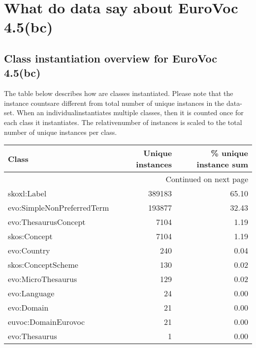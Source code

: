 \documentclass[10pt,a4paper,titlepage,final]{article}
\begin{document}
\section{What do data say about EuroVoc 4.5(bc)}
\subsection{Class instantiation overview for EuroVoc 4.5(bc)}
The table below describes how are classes instantiated. Please note that the instance countsare different from total number of unique instances in the data{-}set. When an individualinstantiates multiple classes, then it is counted once for each class it instantiates. The relativenumber of instances is scaled to the total number of unique instances per class.
\begin{longtable}{lrr}
\toprule
                      Class &  Unique instances &  \% unique instance sum \\
\midrule
\endhead
\midrule
\multicolumn{3}{r}{{Continued on next page}} \\
\midrule
\endfoot

\bottomrule
\endlastfoot
                skoxl:Label &            389183 &                  65.10 \\
 evo:SimpleNonPreferredTerm &            193877 &                  32.43 \\
       evo:ThesaurusConcept &              7104 &                   1.19 \\
               skos:Concept &              7104 &                   1.19 \\
                evo:Country &               240 &                   0.04 \\
         skos:ConceptScheme &               130 &                   0.02 \\
         evo:MicroThesaurus &               129 &                   0.02 \\
               evo:Language &                24 &                   0.00 \\
                 evo:Domain &                21 &                   0.00 \\
        euvoc:DomainEurovoc &                21 &                   0.00 \\
              evo:Thesaurus &                 1 &                   0.00 \\
\end{longtable}
\end{document}
